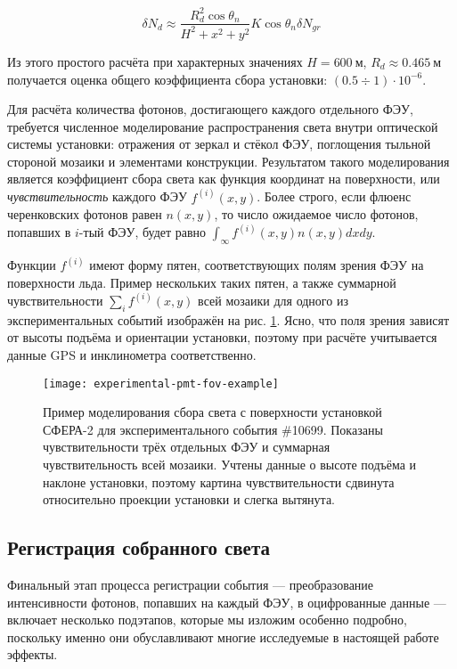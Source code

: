 \begin{equation}
	\delta N_{d} \approx \frac{R_d^2 \cos \theta_n}{H^2 + x^2 + y^2} K \cos \theta_n \delta N_{gr}
\end{equation}

Из этого простого расчёта при характерных значениях $H = 600~\text{м}$, $R_d \approx 0.465~\text{м}$ получается оценка общего коэффициента сбора установки: $(0.5 \div 1) \cdot 10^{-6}$.

Для расчёта количества фотонов, достигающего каждого отдельного ФЭУ, требуется численное моделирование распространения света внутри оптической системы установки: отражения от зеркал и стёкол ФЭУ, поглощения тыльной стороной мозаики и элементами конструкции. Результатом такого моделирования является коэффициент сбора света как функция координат на поверхности, или \textit{чувствительность} каждого ФЭУ $f^{(i)}(x, y)$. Более строго, если флюенс черенковских фотонов равен $n(x, y)$, то число ожидаемое число фотонов, попавших в $i$-тый ФЭУ, будет равно $\int_{\infty} f^{(i)}(x, y) n(x, y) dx dy$.

Функции $f^{(i)}$ имеют форму пятен, соответствующих полям зрения ФЭУ на поверхности льда. Пример нескольких таких пятен, а также суммарной чувствительности $\sum_{i} f^{(i)}(x, y)$ всей мозаики для одного из экспериментальных событий изображён на рис. \ref{pic:experimental-pmt-fov-example}. Ясно, что поля зрения зависят от высоты подъёма и ориентации установки, поэтому при расчёте учитывается данные GPS и инклинометра соответственно.

\begin{figure}
	\centering
	\texttt{[image: experimental-pmt-fov-example]}
	\caption{Пример моделирования сбора света с поверхности установкой СФЕРА-2 для экспериментального события \#10699. Показаны чувствительности трёх отдельных ФЭУ и суммарная чувствительность всей мозаики. Учтены данные о высоте подъёма и наклоне установки, поэтому картина чувствительности сдвинута относительно проекции установки и слегка вытянута.}
	\label{pic:experimental-pmt-fov-example}
\end{figure}

\subsection{Регистрация собранного света}

Финальный этап процесса регистрации события --- преобразование интенсивности фотонов, попавших на каждый ФЭУ, в оцифрованные данные --- включает несколько подэтапов, которые мы изложим особенно подробно, поскольку именно они обуславливают многие исследуемые в настоящей работе эффекты.

